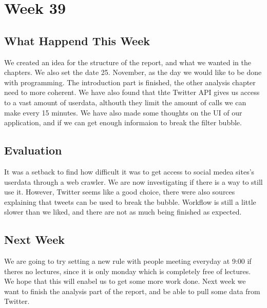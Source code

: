 \section*{Week 39}
\subsection*{What Happend This Week}
We created an idea for the structure of the report, and what we wanted in the
chapters. We also set the date 25. November, as the day we would like
to be done with programming. The introduction part is finished, the other
analysis chapter need to more coherent. We have also found that thte Twitter API
gives us access to a vast amount of userdata, althouth they limit the amount of
calls we can make every 15 minutes. We have also made some thoughts on the UI of
our application, and if we can get enough informaion to break the filter
bubble.

\subsection*{Evaluation}
It was a setback to find how difficult it was to get access to social medea
sites's userdata through a web crawler. We are now investigating if there is a
way to still use it. However, Twitter seems like a good choice, there were
also sources explaining that tweets can be used to break the bubble.
Workflow is still a little slower than we liked, and there are not as much being
finished as expected.

\subsection*{Next Week}
We are going to try setting a new rule with people meeting everyday at 9:00 if
theres no lectures, since it is only monday which is completely free of
lectures. We hope that this will enabel us to get some more work done.
Next week we want to finish the analysis part of the report, and be able to pull
some data from Twitter.




